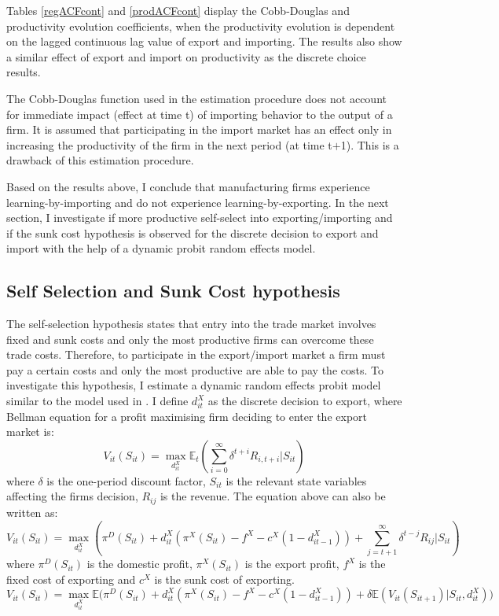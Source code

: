 \documentclass[12pt]{article}
\begin{document}
Tables \ref{regACFcont} and \ref{prodACFcont} display the Cobb-Douglas and
productivity evolution
coefficients,  when the
productivity evolution is dependent on the lagged continuous lag value of
export and importing. The results also show a similar effect of export
and import on productivity as the discrete choice results.  

The Cobb-Douglas function used in the estimation procedure  does not
account for immediate impact (effect at time t) of 
importing behavior to the output of a firm.  It is assumed that
participating in the import market has an effect only  in increasing the
productivity of the firm in the next period (at time t$+$1). This is a drawback of this
estimation procedure. 


Based on the results above,  I conclude that manufacturing firms experience learning-by-importing and
do not experience learning-by-exporting. 
In the next section, I investigate if more productive self-select into
exporting/importing and if the sunk cost hypothesis is observed for
the discrete decision to export and import with the help of a dynamic probit
random effects model. 
\subsection{Self Selection and Sunk Cost hypothesis}\label{sec:ss}
The self-selection hypothesis states that entry into the trade market
involves fixed and sunk costs and only the most productive firms can
overcome these trade costs. Therefore, to participate in the
export/import market a firm must pay a certain costs and only the most
productive are able to pay the costs. To investigate this hypothesis, I
estimate a dynamic random effects probit model similar to the model used
in \textcite{roberts1997decision}. I define $d_{it}^{X}$ as the discrete
decision to export, where
 Bellman equation for a profit maximising firm deciding to enter the
 export market is:
\begin{equation}
V_{it}(S_{it})= \underset{d_{it}^{X}}{\max}  \mathbb{E}_{t}(\sum_{i=0}^{\infty} \delta^{t+i}R_{i,t+i}|S_{it})
\end{equation}
 where $\delta$ is the one-period discount factor, $S_{it}$ is the
 relevant state variables affecting the firms decision, $R_{ij}$ is
 the revenue. The equation above can also be written as:
\begin{equation}
V_{it}(S_{it})= \underset{d_{it}^{X}}{\max} (\pi^{D}(S_{it}) + d_{it}^{X}(\pi^{X}(S_{it})- f^{X} -
c^{X}(1-d_{it-1}^{X}))  + \sum_{j=t+1}^{\infty} \delta^{t-j}R_{ij}|S_{it})
\end{equation}
where $\pi^{D}(S_{it})$ is the domestic profit, $\pi^{X}(S_{it})$ is the export
profit, $f^{X}$ is the fixed cost of exporting and $c^{X}$ is the sunk
cost of exporting. 
\begin{equation}
V_{it}(S_{it})= \underset{d_{it}^{X}}{\max} \mathbb{E}
\Big(\pi^{D}(S_{it}) + d_{it}^{X}(\pi^{X}(S_{it}) - f^{X} -
c^{X}(1-d_{it-1}^{X}))  + \delta \mathbb{E} (V_{it}(S_{it+1})|S_{it},
d_{it}^{X}) \Big)
\end{equation}
\end{document}
